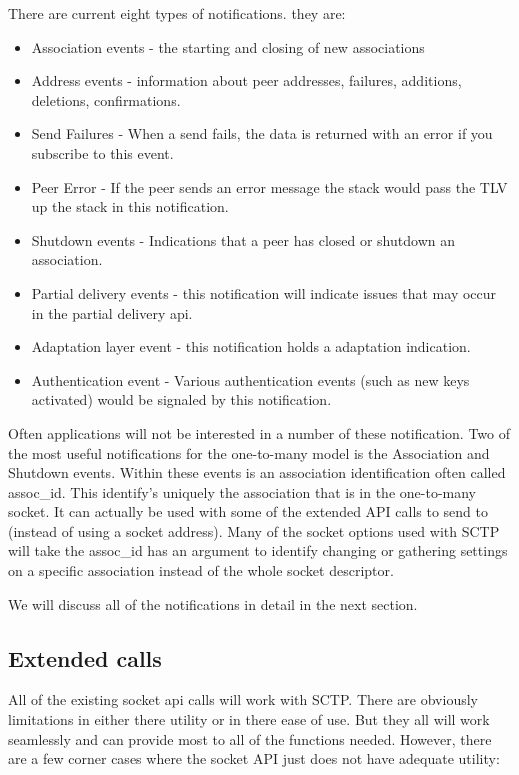 \documentclass[conference]{IEEEtran}
\begin{document}
There are current eight types of notifications. they are:
\begin{itemize}
 \item  Association events - the starting and closing of new associations
 \item  Address events - information about peer addresses, failures, additions, deletions, confirmations.
 \item  Send Failures - When a send fails, the data is returned with an error if you subscribe to this event.
 \item  Peer Error - If the peer sends an error message the stack would pass the TLV up the stack in this notification.
 \item  Shutdown events - Indications that a peer has closed or shutdown an association.
 \item  Partial delivery events - this notification will indicate issues that may occur in the partial delivery api.
 \item  Adaptation layer event - this notification holds a adaptation indication.
 \item  Authentication event - Various authentication events (such as new keys activated) would be signaled by this notification.
 \end{itemize}

Often applications will not be interested in a number of these notification. Two of the most
useful notifications for the one-to-many model is the Association and Shutdown events. Within
these events is an association identification often called assoc\_id. This identify's uniquely the
association that is in the one-to-many socket. It can actually be used with some of the extended
API calls to send to (instead of using a socket address).  Many of the socket options used with
SCTP will take the assoc\_id has an argument to identify changing or gathering settings on
a specific association instead of the whole socket descriptor.

We will discuss all of the notifications in detail in the next section.

\subsection{Extended calls}

All of the existing socket api calls will work with SCTP. There are
obviously limitations in either there utility or in there ease of use.
But they all will work seamlessly and can provide most to all of
the functions needed. However, there are a few corner cases
where the socket API just does not have adequate utility:
\end{document}
